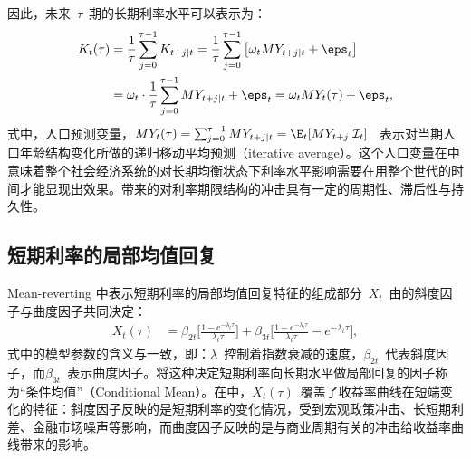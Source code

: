 因此，未来~$\tau$~期的长期利率水平可以表示为：
 \begin{align}\label{k2}
   K_{t}(\tau) &= \frac{1}{\tau}\sum_{j=0}^{\tau-1}K_{t+j|t}
   = \frac{1}{\tau} \sum_{j=0}^{\tau-1} \big[ \omega_t MY_{t+j|t}+\eps_t \big] \nonumber \\
   &= \omega_t \cdot \frac{1}{\tau} \sum_{j=0}^{\tau-1} MY_{t+j|t} + \eps_t
   = \omega_t MY_{t}(\tau) + \eps_t,
 \end{align}
式中，人口预测变量，$MY_{t}(\tau) = \sum_{j=0}^{\tau-1}MY_{t+j|t} = \E_t [MY_{t+j}|\mathcal{I}_t]$~ 表示对当期人口年龄结构变化所做的递归移动平均预测（iterative average）。这个人口变量在中意味着整个社会经济系统的\dsf 对长期均衡状态下利率水平影响需要在用整个世代的时间才能显现出效果。\dsf 带来的对利率期限结构的冲击具有一定的周期性、滞后性与持久性。

\subsection{短期利率的局部均值回复}{Mean-reverting}
中表示短期利率的局部均值回复特征的组成部分~$X_t$~由\dns 的斜度因子与曲度因子共同决定：
 \begin{align}\label{x}
   X_{t}(\tau) &=\beta_{2t} \big[\frac{1-e^{-\lambda_{t} \tau}} {\lambda_{t} \tau} \big]
        + \beta_{3t}\big[\frac{1-e^{-\lambda_{t} \tau}} {\lambda_{t} \tau} - e^{-\lambda_{t} \tau} \big],
 \end{align}
 式中的模型参数的含义与一致，即：$\lambda$~控制着指数衰减的速度，$\beta_{2t}$~代表斜度因子，而$\beta_{3t}$~表示曲度因子。将这种决定短期利率向长期水平做局部回复的因子称为``条件均值''（Conditional Mean）。在中，$X_{t}(\tau)$~覆盖了收益率曲线在短端变化的特征：斜度因子反映的是短期利率的变化情况，受到宏观政策冲击、长短期利差、金融市场噪声等影响，而曲度因子反映的是与商业周期有关的冲击给收益率曲线带来的影响。

